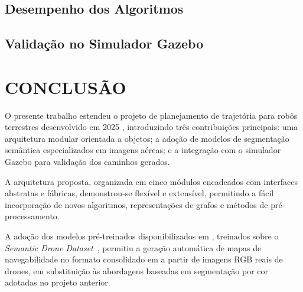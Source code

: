 \documentclass[
    12pt,
    openright,
    oneside,
    a4paper,
    english,
    brazil
]{abntex2}
\begin{document}

\section{Desempenho dos Algoritmos}


\section{Validação no Simulador Gazebo}


\chapter{CONCLUSÃO}


O presente trabalho estendeu o projeto de planejamento de trajetória para robôs terrestres desenvolvido em 2025 \cite{camelo2025}, introduzindo três contribuições principais: uma arquitetura modular orientada a objetos; a adoção de modelos de segmentação semântica especializados em imagens aéreas; e a integração com o simulador Gazebo \cite{koenig2004} para validação dos caminhos gerados.

A arquitetura proposta, organizada em cinco módulos encadeados com interfaces abstratas e fábricas, demonstrou-se flexível e extensível, permitindo a fácil incorporação de novos algoritmos, representações de grafos e métodos de pré-processamento.

A adoção dos modelos pré-treinados disponibilizados em \cite{junior2024_models}, treinados sobre o \emph{Semantic Drone Dataset}~\cite{drone_dataset}, permitiu a geração automática de mapas de navegabilidade no formato consolidado em \cite{junior2025_rrt} a partir de imagens RGB reais de drones, em substituição às abordagens baseadas em segmentação por cor adotadas no projeto anterior.
\end{document}
